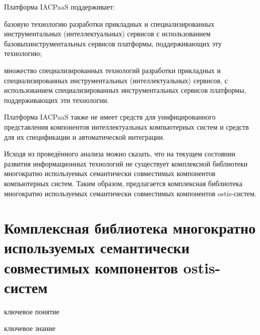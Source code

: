 Платформа IACPaaS поддерживает:

\begin{textitemize}
	\item базовую технологию разработки прикладных и специализированных инструментальных (интеллектуальных) сервисов с использованием базовыхинструментальных сервисов платформы, поддерживающих эту технологию;
	\item множество специализированных технологий разработки прикладных и специализированных инструментальных (интеллектуальных) сервисов, с использованием специализированных инструментальных сервисов платформы, поддерживающих эти технологии.
\end{textitemize}

Платформа IACPaaS также не имеет средств для унифицированного представления компонентов интеллектуальных компьютерных систем и средств для их спецификации и автоматической интеграции.

Исходя из проведённого анализа можно сказать, что на текущем состоянии развития информационных технологий не существует комплексной библиотеки многократно используемых семантически совместимых компонентов компьютерных систем. Таким образом, предлагается комплексная библиотека многократно используемых семантически совместимых компонентов ostis-систем.

\section{Комплексная библиотека многократно используемых семантически совместимых компонентов ostis-систем}
\label{ostis_library_section}

\begin{SCn}
\begin{scnrelfromlist}{ключевое понятие}
\end{scnrelfromlist}
\end{SCn}

\bigskip

\begin{SCn}
\begin{scnrelfromlist}{ключевое знание}
\end{scnrelfromlist}
\end{SCn}

\bigskip

